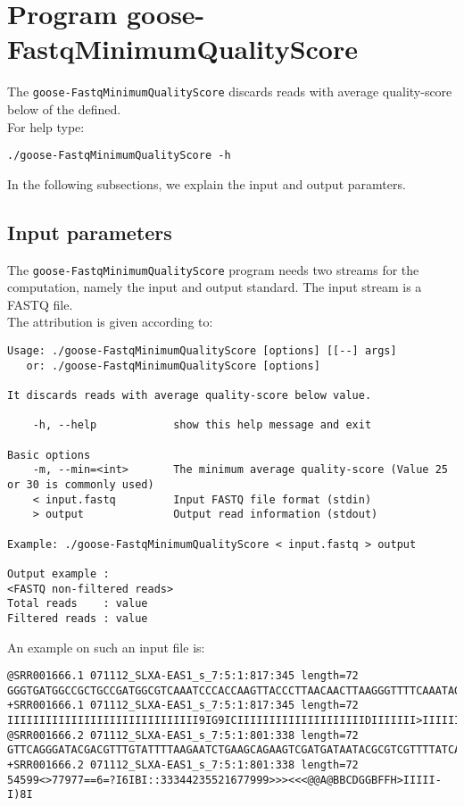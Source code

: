 \section{Program goose-FastqMinimumQualityScore}
The \texttt{goose-FastqMinimumQualityScore} discards reads with average quality-score below of the defined.\\
For help type:
\begin{lstlisting}
./goose-FastqMinimumQualityScore -h
\end{lstlisting}
In the following subsections, we explain the input and output paramters.

\subsection*{Input parameters}

The \texttt{goose-FastqMinimumQualityScore} program needs two streams for the computation,
namely the input and output standard. The input stream is a FASTQ file.\\
The attribution is given according to:
\begin{lstlisting}
Usage: ./goose-FastqMinimumQualityScore [options] [[--] args]
   or: ./goose-FastqMinimumQualityScore [options]

It discards reads with average quality-score below value.

    -h, --help            show this help message and exit

Basic options
    -m, --min=<int>       The minimum average quality-score (Value 25 or 30 is commonly used)
    < input.fastq         Input FASTQ file format (stdin)
    > output              Output read information (stdout)

Example: ./goose-FastqMinimumQualityScore < input.fastq > output

Output example :
<FASTQ non-filtered reads>
Total reads    : value
Filtered reads : value
\end{lstlisting}
An example on such an input file is:
\begin{lstlisting}
@SRR001666.1 071112_SLXA-EAS1_s_7:5:1:817:345 length=72
GGGTGATGGCCGCTGCCGATGGCGTCAAATCCCACCAAGTTACCCTTAACAACTTAAGGGTTTTCAAATAGA
+SRR001666.1 071112_SLXA-EAS1_s_7:5:1:817:345 length=72
IIIIIIIIIIIIIIIIIIIIIIIIIIIIII9IG9ICIIIIIIIIIIIIIIIIIIIIDIIIIIII>IIIIII/
@SRR001666.2 071112_SLXA-EAS1_s_7:5:1:801:338 length=72
GTTCAGGGATACGACGTTTGTATTTTAAGAATCTGAAGCAGAAGTCGATGATAATACGCGTCGTTTTATCAT
+SRR001666.2 071112_SLXA-EAS1_s_7:5:1:801:338 length=72
54599<>77977==6=?I6IBI::33344235521677999>>><<<@@A@BBCDGGBFFH>IIIII-I)8I
\end{lstlisting}

